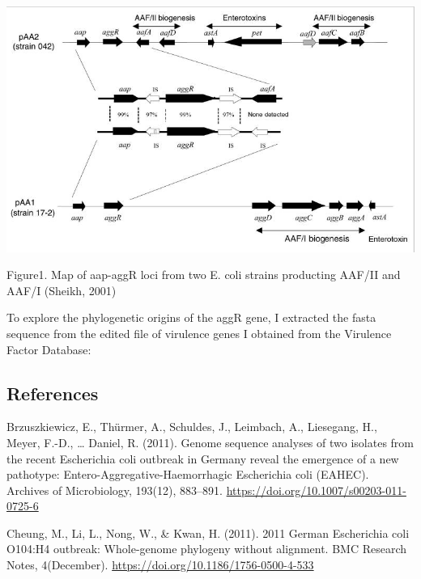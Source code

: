 \documentclass[12pt,]{article}
\newenvironment{Shaded}{\begin{snugshade}}{\end{snugshade}}
\newcommand{\KeywordTok}[1]{\textcolor[rgb]{0.13,0.29,0.53}{\textbf{#1}}}
\newcommand{\StringTok}[1]{\textcolor[rgb]{0.31,0.60,0.02}{#1}}
\newcommand{\FunctionTok}[1]{\textcolor[rgb]{0.00,0.00,0.00}{#1}}
\newcommand{\OperatorTok}[1]{\textcolor[rgb]{0.81,0.36,0.00}{\textbf{#1}}}
\newcommand{\NormalTok}[1]{#1}
\begin{document}
\includegraphics{aggR_operon.png}\\

\begin{left}Figure1. Map of aap-aggR loci from two E. coli strains producting AAF/II and AAF/I (Sheikh, 2001) \end{left}

To explore the phylogenetic origins of the aggR gene, I extracted the
fasta sequence from the edited file of virulence genes I obtained from
the Virulence Factor Database:

\begin{Shaded}
\end{Shaded}

\subsection{References}\label{references}

Brzuszkiewicz, E., Thürmer, A., Schuldes, J., Leimbach, A., Liesegang,
H., Meyer, F.-D., \ldots{} Daniel, R. (2011). Genome sequence analyses
of two isolates from the recent Escherichia coli outbreak in Germany
reveal the emergence of a new pathotype: Entero-Aggregative-Haemorrhagic
Escherichia coli (EAHEC). Archives of Microbiology, 193(12), 883--891.
\url{https://doi.org/10.1007/s00203-011-0725-6}

Cheung, M., Li, L., Nong, W., \& Kwan, H. (2011). 2011 German
Escherichia coli O104:H4 outbreak: Whole-genome phylogeny without
alignment. BMC Research Notes, 4(December).
\url{https://doi.org/10.1186/1756-0500-4-533}
\end{document}
